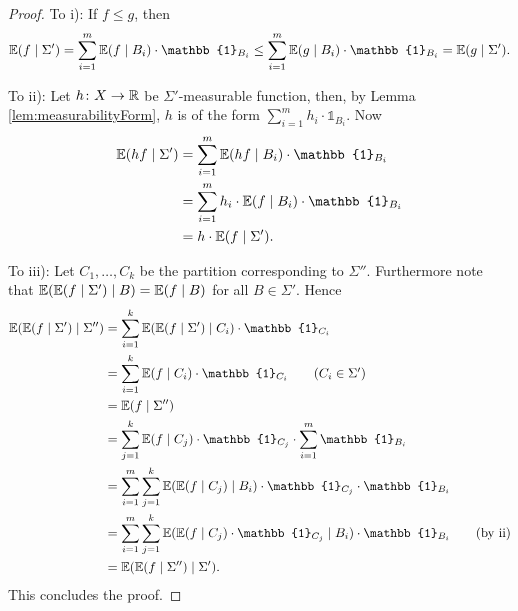 \begin{proof}
	To i): If $f\leq g$, then
	\[\E(f\mid \Sigma')=\sum_{i=1}^m\E(f\mid B_i)\cdot \mathbb{1}_{B_i}\leq \sum_{i=1}^m\E(g\mid B_i)\cdot \mathbb{1}_{B_i}=\E(g\mid \Sigma').\]
				
				
	To ii): Let $h\colon X\to\mathbb{R}$ be $\Sigma'$-measurable function, then, by Lemma \ref{lem:measurabilityForm}, $h$ is of the form $\sum_{i=1}^{m}h_i\cdot \mathbb{1}_{B_i}$. Now 
	\begin{align*}
		\E(h f\mid\Sigma') & =\sum_{i=1}^{m}\E(hf\mid B_i)\cdot\mathbb{1}_{B_i}        \\
		                   & =\sum_{i=1}^{m}h_i\cdot\E(f\mid B_i)\cdot\mathbb{1}_{B_i} \\
		                   & =h\cdot\E(f\mid\Sigma').                                  
	\end{align*}
				
	To iii): Let $C_1,\dots,C_k$ be the partition corresponding to $\Sigma''$. Furthermore note that $\mathbb{E}(\mathbb{E}(f\mid \Sigma')\mid B)=\mathbb{E}(f\mid B)$ for all $B\in\Sigma'$. Hence
	\begin{align*}
		\E(\E(f\mid \Sigma')\mid\Sigma'') & =\sum_{i=1}^{k}\E(\E(f\mid \Sigma')\mid C_i)\cdot\mathbb{1}_{C_i}                                           \\
		                                  & =\sum_{i=1}^{k}\E(f\mid C_i)\cdot\mathbb{1}_{C_i}\tag{$C_i\in\Sigma'$}                                      \\
		                                  & =\E(f\mid\Sigma'')                                                                                          \\
		                                  & =\sum_{j=1}^{k}\E(f\mid C_j)\cdot\mathbb{1}_{C_j}\cdot\sum_{i=1}^{m}\mathbb{1}_{B_i}                        \\
		                                  & =\sum_{i=1}^{m}\sum_{j=1}^{k}\E(\E(f\mid C_j)\mid B_i)\cdot\mathbb{1}_{C_j}\cdot\mathbb{1}_{B_i}            \\
		                                  & =\sum_{i=1}^{m}\sum_{j=1}^{k}\E(\E(f\mid C_j)\cdot\mathbb{1}_{C_j}\mid B_i)\cdot\mathbb{1}_{B_i}\tag{by ii} \\
		                                  & =\E(\E(f\mid \Sigma'')\mid\Sigma').                                                                         
	\end{align*}
	This concludes the proof.
\end{proof}
		
